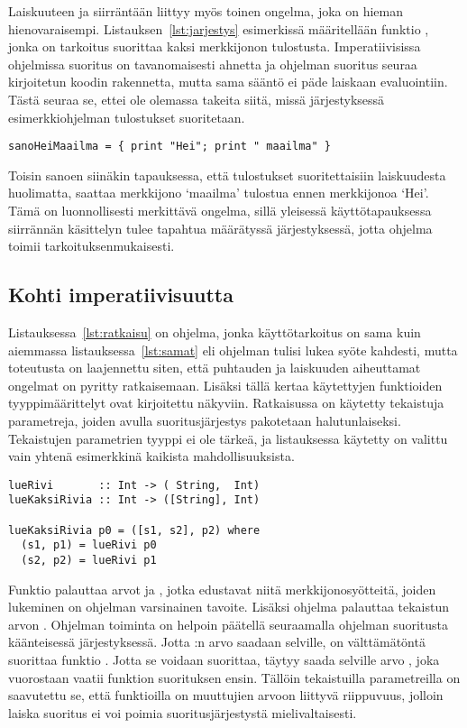 \documentclass[finnish]{tktltiki2}
\begin{document}
Laiskuuteen ja siirräntään liittyy myös toinen ongelma, joka on hieman hienovaraisempi.
Listauksen~\ref{lst:jarjestys} esimerkissä määritellään funktio , jonka on
tarkoitus suorittaa kaksi merkkijonon tulostusta. Imperatiivisissa ohjelmissa suoritus on
tavanomaisesti ahnetta ja ohjelman suoritus seuraa kirjoitetun koodin rakennetta, mutta sama sääntö
ei päde laiskaan evaluointiin. Tästä seuraa se, ettei ole olemassa takeita siitä, missä
järjestyksessä esimerkkiohjelman tulostukset suoritetaan.

\begin{lstlisting}[float,label={lst:jarjestys},caption={Kahden tulostuksen pseudokoodi}]
sanoHeiMaailma = { print "Hei"; print " maailma" }
\end{lstlisting}

Toisin sanoen siinäkin tapauksessa, että tulostukset suoritettaisiin laiskuudesta huolimatta,
saattaa merkkijono `maailma' tulostua ennen merkkijonoa `Hei'. Tämä on luonnollisesti merkittävä
ongelma, sillä yleisessä käyttötapauksessa siirrännän käsittelyn tulee tapahtua määrätyssä
järjestyksessä, jotta ohjelma toimii tarkoituksenmukaisesti.

\subsection{Kohti imperatiivisuutta}

Listauksessa~\ref{lst:ratkaisu} on ohjelma, jonka käyttötarkoitus on sama kuin aiemmassa
listauksessa~\ref{lst:samat} eli ohjelman tulisi lukea syöte kahdesti, mutta toteutusta on
laajennettu siten, että puhtauden ja laiskuuden aiheuttamat ongelmat on pyritty ratkaisemaan.
Lisäksi tällä kertaa käytettyjen funktioiden tyyppimäärittelyt ovat kirjoitettu näkyviin.
Ratkaisussa on käytetty tekaistuja parametreja, joiden avulla suoritusjärjestys pakotetaan
halutunlaiseksi. Tekaistujen parametrien tyyppi ei ole tärkeä, ja listauksessa käytetty 
on valittu vain yhtenä esimerkkinä kaikista mahdollisuuksista.

\begin{lstlisting}[float,label={lst:ratkaisu},caption={Suoritusjärjestys riippuvuuksien avulla}]
lueRivi       :: Int -> ( String,  Int)
lueKaksiRivia :: Int -> ([String], Int)

lueKaksiRivia p0 = ([s1, s2], p2) where
  (s1, p1) = lueRivi p0
  (s2, p2) = lueRivi p1
\end{lstlisting}

Funktio  palauttaa arvot  ja , jotka edustavat niitä
merkkijonosyötteitä, joiden lukeminen on ohjelman varsinainen tavoite. Lisäksi ohjelma palauttaa
tekaistun arvon . Ohjelman toiminta on helpoin päätellä seuraamalla ohjelman suoritusta
käänteisessä järjestyksessä. Jotta :n arvo saadaan selville, on välttämätöntä suorittaa
funktio . Jotta se voidaan suorittaa, täytyy saada selville arvo , joka
vuorostaan vaatii funktion  suorituksen ensin. Tällöin tekaistuilla parametreilla
on saavutettu se, että funktioilla  on muuttujien arvoon liittyvä riippuvuus, jolloin
laiska suoritus ei voi poimia suoritusjärjestystä mielivaltaisesti.
\end{document}
